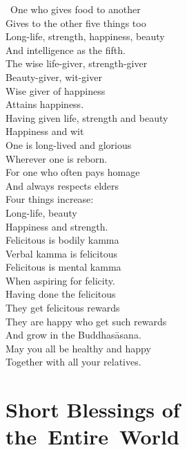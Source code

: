 \begin{english-verses}
  \anglebracketleft\ \hspace{-0.5mm}One who gives food to another \hspace{-0.5mm}\anglebracketright\ \\
  Gives to the other five things too\\
  Long-life, strength, happiness, beauty\\
  And intelligence as the fifth.\\
  The wise life-giver, strength-giver\\
  Beauty-giver, wit-giver\\
  Wise giver of happiness\\
  Attains happiness.\\
  Having given life, strength and beauty\\
  Happiness and wit\\
  One is long-lived and glorious\\
  Wherever one is reborn.\\
  For one who often pays homage\\
  And always respects elders\\
  Four things increase:\\
  Long-life, beauty\\
  Happiness and strength.\\
  Felicitous is bodily kamma\\
  Verbal kamma is felicitous\\
  Felicitous is mental kamma\\
  When aspiring for felicity.\\
  Having done the felicitous\\
  They get felicitous rewards\\
  They are happy who get such rewards\\
  And grow in the Buddhasāsana.\\
  May you all be healthy and happy\\
  Together with all your relatives.
\end{english-verses}

\suttaRef{[AN 5.37 / Dhp 109 / AN 3.155]}

\clearpage



\section{Short Blessings of \mbox{the}~Entire~World}
\label{blessings-of-entire-world}

